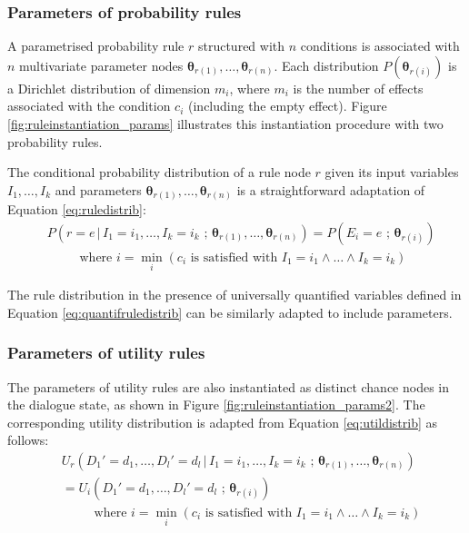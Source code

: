 \subsubsection*{Parameters of probability rules}

A parametrised probability rule $r$ structured with $n$ conditions is associated with $n$ multivariate parameter nodes $\boldsymbol\theta_{r(1)}, \dots, \boldsymbol\theta_{r(n)}$.  Each distribution $P(\boldsymbol\theta_{r(i)})$ is a Dirichlet distribution of dimension $m_i$, where $m_i$ is the number of effects associated with the condition $c_i$ (including the empty effect). Figure \ref{fig:ruleinstantiation_params} illustrates this instantiation procedure with two probability rules.  

The conditional probability distribution of a rule node $r$ given its input variables $I_1, \dots, I_k$ and parameters $\boldsymbol\theta_{r(1)}, \dots, \boldsymbol\theta_{r(n)}$ is a straightforward adaptation of Equation \eqref{eq:ruledistrib}:
\begin{align}
& P(r\!=\!e \, | \, I_1\!=\!i_1, \dots,  I_k\!=\!i_k \, \, ; \, \boldsymbol\theta_{r(1)}, \dots, \boldsymbol\theta_{r(n)})  = P(E_i = e\, \, ; \, \boldsymbol\theta_{r(i)}) \\
& \; \; \; \; \; \; \; \; \text{ where } i = \min_i (c_i \text{ is satisfied with } I_1\!=\!i_1 \land \dots \land I_k\!=\!i_k) \nonumber
\end{align}

The rule distribution in the presence of universally quantified variables defined in Equation \eqref{eq:quantifruledistrib} can be similarly adapted to include parameters.

\subsubsection*{Parameters of utility rules}

The parameters of utility rules are also instantiated as distinct chance nodes in the dialogue state, as shown in Figure \ref{fig:ruleinstantiation_params2}. The corresponding utility distribution is adapted from Equation \eqref{eq:utildistrib} as follows:
\begin{align}
& U_r(D_1'\!=\!d_1, \dots, D_l'\!=\!d_l \, | \, I_1\!=\!i_1, \dots, I_k\!=\!i_k \, \, ; \, \boldsymbol\theta_{r(1)}, \dots, \boldsymbol\theta_{r(n)}) \nonumber \\ 
& = U_i(D_1'\!=\!d_1, \dots, D_l'\!=\!d_l \, \, ; \, \boldsymbol\theta_{r(i)})  \label{eq:utildistrib_params}\\
& \; \; \; \; \; \; \; \; \text{ where } i = \min_i (c_i \text{ is satisfied with } I_1\!=\!i_1 \land \dots \land I_k\!=\!i_k) \nonumber
\end{align}

